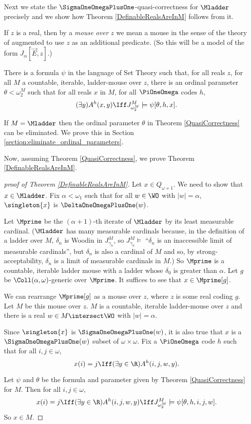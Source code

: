 \documentclass[oneside,12pt]{amsart}
\begin{document}
Next we state the
$\SigmaOneOmegaPlusOne$-quasi-correctness for $\Mladder$ precisely and
we show how
Theorem \ref{DefinableRealsAreInM} follows from it.

If $z$ is a real, then by a \emph{mouse over $z$} we mean a mouse in the
sense of the theory of \cite{FSIT} augmented to use $z$ as an additional predicate.
(So this will be a model of the form $J_{\alpha}[\vec{E},z]$.)

\begin{theorem}
\label{QuasiCorrectness}
There is a formula $\psi$ in the language of Set Theory such that, for all
reals $z$, for all $M$ a countable, iterable, ladder-mouse over $z$,
there is an ordinal parameter $\theta<\omega_2^M$ such that
for all reals $x$ in $M$,
for all $\PiOneOmega$ codes $h$,
$$(\exists y) A^h(x,y) \Iff J^M_{\omega_2^M} \models \psi[\theta, h,x].$$
\end{theorem}

\begin{remark}
If $M=\Mladder$ then the ordinal parameter $\theta$ in Theorem \ref{QuasiCorrectness} can be eliminated.
We prove this in Section \ref{section:eliminate_ordinal_parameters}.
\end{remark}

Now, assuming Theorem \ref{QuasiCorrectness}, we prove Theorem \ref{DefinableRealsAreInM}.

\begin{proof}[proof of Theorem \ref{DefinableRealsAreInM}]
Let $x\in Q_{\omega+1}$. We need to show that $x\in\Mladder$.
Fix $\alpha<\omega_1$ such
that for all $w\in\WO$ with $|w|=\alpha$, $\singleton{x}$ is 
$\DeltaOneOmegaPlusOne(w)$.

Let $\Mprime$ be the $(\alpha+1)$-th iterate of $\Mladder$ by its least
measurable cardinal. ($\Mladder$ has many measurable cardinals because,
in the definition of a ladder over $M$, $\delta_n$ is Woodin in 
$J^M_{\gamma_n}$, so $J^M_{\gamma_n}\models$ ``$\delta_n$ is an inaccessible
limit of measurable cardinals'', but $\delta_n$ is also a cardinal of $M$
and so, by strong-acceptability, $\delta_n$ is a limit of measurable cardinals
in $M$.)
So $\Mprime$ is a countable, iterable ladder mouse with
a ladder whose $\delta_0$ is greater than $\alpha$. Let $g$ be $\Coll(\alpha,\omega)$-generic
over $\Mprime$. It suffices to see that $x\in\Mprime[g]$.

We can rearrange $\Mprime[g]$ as a mouse over $z$, where $z$ is some real coding $g$.
Let $M$ be this mouse over $z$. $M$ is a countable, iterable ladder-mouse over $z$ and there
is a real $w\in M\intersect\WO$ with $|w|=\alpha$.

Since $\singleton{x}$ is  $\SigmaOneOmegaPlusOne(w)$, it is also true that
$x$ is a $\SigmaOneOmegaPlusOne(w)$ subset of $\omega\times\omega$.
Fix a $\PiOneOmega$ code $h$ such that for all $i,j\in\omega$,
$$x(i)=j \Iff (\exists y\in\R)A^h(i,j,w,y).$$

Let $\psi$ and $\theta$ be the formula and parameter given by Theorem \ref{QuasiCorrectness}
for $M$. Then for all
$i,j\in\omega$,
$$x(i)=j \Iff (\exists y\in\R)A^h(i,j,w,y) \Iff J^M_{\omega_2^M} \models \psi[\theta,h,i,j,w].$$
So $x\in M$.
\end{proof}
\end{document}
